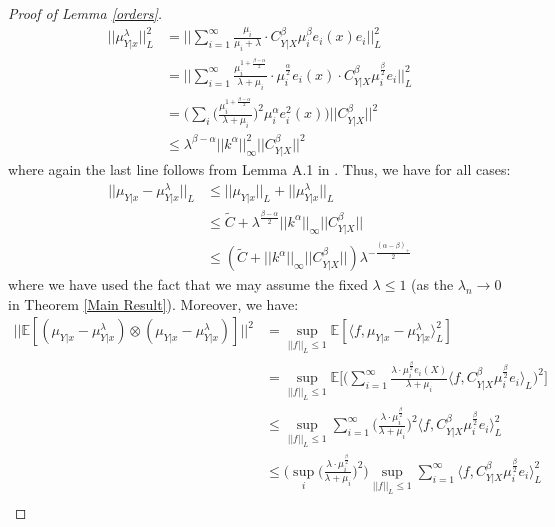 \documentclass[accepted]{article}
\theoremstyle{definition}
\begin{document}
\begin{proof}[Proof of Lemma \ref{orders}]
\begin{align*}
    ||\mu^{\lambda}_{Y|x}||^2_{L} & = \Big|\Big|\sum_{i = 1}^{\infty} \frac{\mu_i}{\mu_i + \lambda} \cdot C^{\beta}_{Y|X} \mu^{\beta}_i e_i(x) e_i\Big|\Big|_{L}^2 \\
        & = \Big|\Big|\sum_{i = 1}^{\infty} \frac{\mu_i^{1 + \frac{\beta - \alpha}{2}}}{\lambda + \mu_i} \cdot \mu_i^{\frac{\alpha}{2}}e_i(x) \cdot C^{\beta}_{Y|X} \mu^{\frac{\beta}{2}}_i e_i\Big|\Big|^2_{L} \\
    & = \Big(\sum_i \Big(\frac{\mu_i^{1 + \frac{\beta - \alpha}{2}}}{\lambda + \mu_i}\Big)^2 \mu_i^{\alpha}e^2_i(x)\Big)||C^{\beta}_{Y|X}||^2 \\
    & \leq \lambda^{\beta - \alpha}||k^{\alpha}||^2_{\infty}||C^{\beta}_{Y|X}||^2
\end{align*}
where again the last line follows from Lemma A.1 in \cite{fischer2020sobolev}. Thus, we have for all cases:
\begin{align*}
    ||\mu_{Y|x} - \mu^{\lambda}_{Y|x}||_{L} & \leq ||\mu_{Y|x}||_{L} + ||\mu^{\lambda}_{Y|x}||_{L} \\
    & \leq \tilde{C} + \lambda^{\frac{\beta - \alpha}{2}}||k^{\alpha}||_{\infty}||C^{\beta}_{Y|X}|| \\
    & \leq (\tilde{C} + ||k^{\alpha}||_{\infty}||C^{\beta}_{Y|X}||)\lambda^{-\frac{(\alpha - \beta)_{+}}{2}}
\end{align*}
where we have used the fact that we may assume the fixed $\lambda \leq 1$ (as the $\lambda_n \to 0$ in Theorem \ref{Main Result}). Moreover, we have:
\begin{align}
    ||\mathbb{E}[(\mu_{Y|x} - \mu^{\lambda}_{Y|x}) \otimes (\mu_{Y|x} - \mu^{\lambda}_{Y|x})]||^2 &= \sup_{||f||_{L} \leq 1} \mathbb{E}[\langle f,  \mu_{Y|x} - \mu^{\lambda}_{Y|x}\rangle_{L}^2] \nonumber \\
    & = \sup_{||f||_{L} \leq 1} \mathbb{E}\Big[\Big(\sum_{i = 1}^{\infty} \frac{\lambda \cdot \mu^{\frac{\beta}{2}}_i e_i(X)}{\lambda + \mu_i} \langle f, C^{\beta}_{Y|X} \mu^{\frac{\beta}{2}}_i e_i \rangle_{L}\Big)^2\Big] \nonumber \\
    & \leq \sup_{||f||_{L} \leq 1} \sum_{i = 1}^{\infty} \Big(\frac{\lambda \cdot \mu^{\frac{\beta}{2}}_i}{\lambda + \mu_i}\Big)^2 \langle f, C^{\beta}_{Y|X} \mu^{\frac{\beta}{2}}_i e_i \rangle^2_{L} \label{eq: After Exp} \\
    & \leq \Big(\sup_{i} \Big(\frac{\lambda \cdot \mu^{\frac{\beta}{2}}_i}{\lambda + \mu_i}\Big)^2\Big) \sup_{||f||_{L} \leq 1} \sum_{i = 1}^{\infty} \langle f, C^{\beta}_{Y|X} \mu^{\frac{\beta}{2}}_i e_i \rangle^2_{L} \\

\end{align}
\end{proof}
\end{document}
